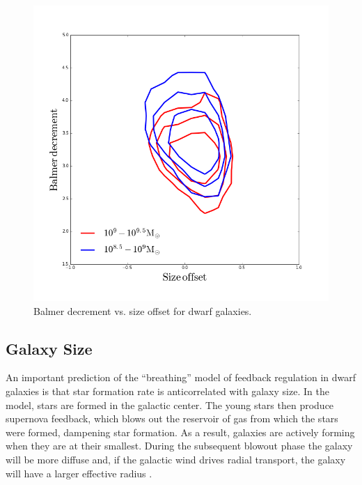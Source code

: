 \documentclass[iop]{emulateapj}
\begin{document}
\begin{figure}
	\centering
	\includegraphics[width=1.5 \columnwidth]{BD_size.png}
	\caption{Balmer decrement vs. size offset for dwarf galaxies.}
     \label{fig:bdvsize}

\end{figure}


\subsection{Galaxy Size}

An important prediction of the ``breathing'' model of feedback regulation in dwarf galaxies is that star formation rate is anticorrelated with galaxy size. In the model, stars are formed in the galactic center. The young stars then produce supernova feedback, which blows out the reservoir of gas from which the stars were formed, dampening star formation. As a result, galaxies are actively forming when they are at their smallest. During the subsequent blowout phase the galaxy will be more diffuse and, if the galactic wind drives radial transport, the galaxy will have a larger effective radius \citep{EB17}. 
\end{document}
